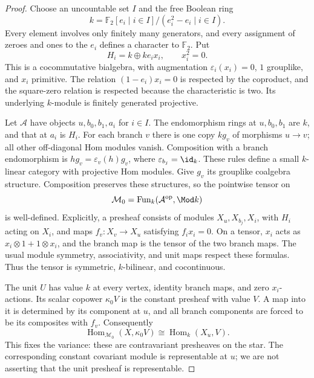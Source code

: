 \begin{proof}
Choose an uncountable set $I$ and the free Boolean ring
\[
 k=\mathbb F_2[e_i\mid i\in I]/(e_i^2-e_i\mid i\in I).
\]
Every element involves only finitely many generators, and every assignment of zeroes and ones to the $e_i$ defines a character to $\mathbb F_2$. Put
\[
 H_i=k\oplus ke_i x_i,\qquad x_i^2=0.
\]
This is a cocommutative bialgebra, with augmentation $\varepsilon_i(x_i)=0$, $1$ grouplike, and $x_i$ primitive. The relation $(1-e_i)x_i=0$ is respected by the coproduct, and the square-zero relation is respected because the characteristic is two. Its underlying $k$-module is finitely generated projective.

Let $\mathcal A$ have objects $u,b_0,b_1,a_i$ for $i\in I$. The endomorphism rings at $u,b_0,b_1$ are $k$, and that at $a_i$ is $H_i$. For each branch $v$ there is one copy $kg_v$ of morphisms $u\to v$; all other off-diagonal Hom modules vanish. Composition with a branch endomorphism is $h g_v=\varepsilon_v(h)g_v$, where $\varepsilon_{b_j}=\id_k$. These rules define a small $k$-linear category with projective Hom modules. Give $g_v$ its grouplike coalgebra structure. Composition preserves these structures, so the pointwise tensor on
\[
 \mathcal M_0=\operatorname{Fun}_k(\mathcal A^{\mathrm{op}},\Mod k)
\]
is well-defined. Explicitly, a presheaf consists of modules $X_u,X_{b_j},X_i$, with $H_i$ acting on $X_i$, and maps $f_v:X_v\to X_u$ satisfying $f_i x_i=0$. On a tensor, $x_i$ acts as $x_i\otimes1+1\otimes x_i$, and the branch map is the tensor of the two branch maps. The usual module symmetry, associativity, and unit maps respect these formulas. Thus the tensor is symmetric, $k$-bilinear, and cocontinuous.

The unit $U$ has value $k$ at every vertex, identity branch maps, and zero $x_i$-actions. Its scalar copower $\kappa_0V$ is the constant presheaf with value $V$. A map into it is determined by its component at $u$, and all branch components are forced to be its composites with $f_v$. Consequently
\[
 \operatorname{Hom}_{\mathcal M_0}(X,\kappa_0V)
 \cong\operatorname{Hom}_k(X_u,V).
\]
This fixes the variance: these are contravariant presheaves on the star. The corresponding constant covariant module is representable at $u$; we are not asserting that the unit presheaf is representable.


\end{proof}
